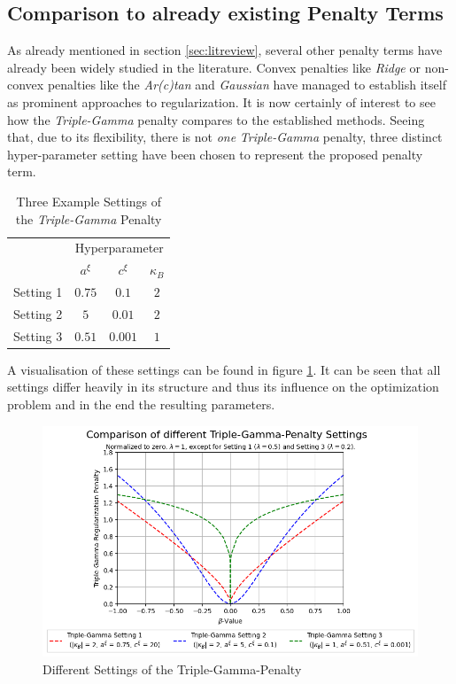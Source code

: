 \documentclass[12pt,a4paper]{article}
\begin{document}
\newpage

\subsection{Comparison to already existing Penalty Terms}\label{subsec:comparepenalties}

As already mentioned in section \ref{sec:litreview}, several other penalty terms have already been widely studied in the literature. Convex penalties like \textit{Ridge} \parencite{HoerlKennard1970a} or non-convex penalties like the \textit{Ar(c)tan} \parencite{WangZhu2016} and \textit{Gaussian} \parencite{JohnVettamWu2022} have managed to establish itself as prominent approaches to regularization. It is now certainly of interest to see how the \textit{Triple-Gamma} penalty compares to the established methods. Seeing that, due to its flexibility, there is not \textit{one} \textit{Triple-Gamma} penalty, three distinct hyper-parameter setting have been chosen to represent the proposed penalty term. 

\begin{table}[h!]
\centering
\begin{tabular}{l|ccc}\toprule
		& \multicolumn{3}{c}{Hyperparameter} \\\cmidrule(r{4pt}){2-4}
     	& $a^\xi$  & $c^\xi$ & $\kappa_B$\\\midrule
Setting 1&	$0.75$	&	$0.1$ &	$2$\\
Setting 2&	$5$  &   $0.01$ & $2$\\
Setting 3&  $0.51$  & $0.001$&$1$\\ \bottomrule
\end{tabular}
\caption{Three Example Settings of the \textit{Triple-Gamma} Penalty}
\label{tab:TGSettings}
\end{table}

A visualisation of these settings can be found in figure \ref{fig:DifferentTGPSettings}. It can be seen that all settings differ heavily in its structure and thus its influence on the optimization problem and in the end the resulting parameters. 

\begin{figure}[H]
\centering
\includegraphics[scale=0.75]{../02_simulation/021_simulation_figures/TGPenalty_DifferentSettings.png}
\caption{Different Settings of the Triple-Gamma-Penalty}
\label{fig:DifferentTGPSettings}
\end{figure}
\end{document}
